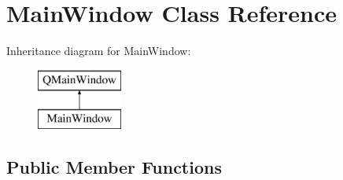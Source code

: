\hypertarget{classMainWindow}{}\section{Main\+Window Class Reference}
\label{classMainWindow}
Inheritance diagram for Main\+Window\+:\begin{figure}[H]
\begin{center}
\leavevmode
\includegraphics[height=2.000000cm]{classMainWindow}
\end{center}
\end{figure}
\subsection*{Public Member Functions}
